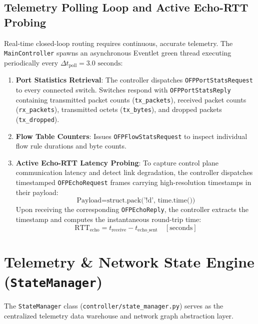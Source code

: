 \documentclass[12pt,a4paper,oneside]{report}
\begin{document}
\subsection{Telemetry Polling Loop and Active Echo-RTT Probing}
Real-time closed-loop routing requires continuous, accurate telemetry. The \texttt{MainController} spawns an asynchronous Eventlet green thread executing periodically every $\Delta t_{\text{poll}} = 3.0\text{ seconds}$:
\begin{enumerate}
    \item \textbf{Port Statistics Retrieval}: The controller dispatches \texttt{OFPPortStatsRequest} to every connected switch. Switches respond with \texttt{OFPPortStatsReply} containing transmitted packet counts (\texttt{tx\_packets}), received packet counts (\texttt{rx\_packets}), transmitted octets (\texttt{tx\_bytes}), and dropped packets (\texttt{tx\_dropped}).
    \item \textbf{Flow Table Counters}: Issues \texttt{OFPFlowStatsRequest} to inspect individual flow rule durations and byte counts.
    \item \textbf{Active Echo-RTT Latency Probing}: To capture control plane communication latency and detect link degradation, the controller dispatches timestamped \texttt{OFPEchoRequest} frames carrying high-resolution timestamps in their payload:
    \begin{equation}
        \text{Payload} = \text{struct.pack('!d', time.time())}
    \end{equation}
    Upon receiving the corresponding \texttt{OFPEchoReply}, the controller extracts the timestamp and computes the instantaneous round-trip time:
    \begin{equation}
        \text{RTT}_{\text{echo}} = t_{\text{receive}} - t_{\text{echo\_sent}} \quad [\text{seconds}]
    \end{equation}
\end{enumerate}

\section{Telemetry \& Network State Engine (\texttt{StateManager})}
The \texttt{StateManager} class (\texttt{controller/state\_manager.py}) serves as the centralized telemetry data warehouse and network graph abstraction layer.
\end{document}
